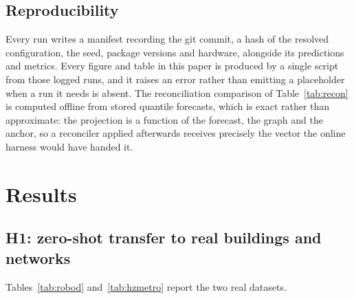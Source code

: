 \documentclass[utf8]{FrontiersinHarvard}
\newif\ifrevisionmarkup
\newcommand{\new}[1]{\ifrevisionmarkup\textcolor{revision}{#1}\else#1\fi}
\newif\ifsecondrevisionmarkup
\newcommand{\rev}[1]{\ifsecondrevisionmarkup\textcolor{revisiontwo}{#1}\else#1\fi}
\theoremstyle{plain}
\theoremstyle{definition}
\theoremstyle{remark}
\begin{document}
\subsection{Reproducibility}

Every run writes a manifest recording the git commit, a hash of the resolved configuration, the seed, package versions and hardware, alongside its predictions and metrics. Every figure and table in this paper is produced by a single script from those logged runs, and it raises an error rather than emitting a placeholder when a run it needs is absent. The reconciliation comparison of Table~\ref{tab:recon} is computed offline from stored quantile forecasts, which is exact rather than approximate: the projection is a function of the forecast, the graph and the anchor, so a reconciler applied afterwards receives precisely the vector the online harness would have handed it.

\section{Results}
\label{sec:results}

\subsection{H1: zero-shot transfer to real buildings and networks}
\label{sec:h1}

Tables~\ref{tab:robod} and~\ref{tab:hzmetro} report the two real datasets. \new{}
\end{document}
